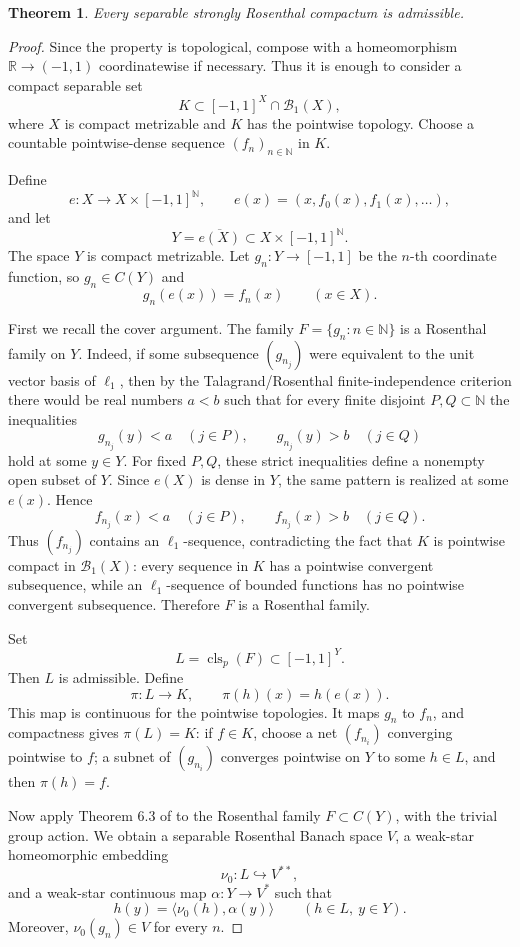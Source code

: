 \documentclass[11pt]{article}
\newtheorem{theorem}{Theorem}
\newcommand{\Baire}{\mathcal B_1}
\newcommand{\clp}{\operatorname{cls}_p}
\newcommand{\RR}{\mathbb R}
\newcommand{\NN}{\mathbb N}
\begin{document}
\begin{theorem}
Every separable strongly Rosenthal compactum is admissible.
\end{theorem}

\begin{proof}
Since the property is topological, compose with a homeomorphism
\(\RR\to(-1,1)\) coordinatewise if necessary.  Thus it is enough to consider a
compact separable set
\[
  K\subset[-1,1]^X\cap \Baire(X),
\]
where \(X\) is compact metrizable and \(K\) has the pointwise topology.  Choose
a countable pointwise-dense sequence \((f_n)_{n\in\NN}\) in \(K\).

Define
\[
  e:X\to X\times[-1,1]^{\NN},
  \qquad
  e(x)=(x,f_0(x),f_1(x),\ldots),
\]
and let
\[
  Y=\overline{e(X)}\subset X\times[-1,1]^{\NN}.
\]
The space \(Y\) is compact metrizable.  Let \(g_n:Y\to[-1,1]\) be the
\(n\)-th coordinate function, so \(g_n\in C(Y)\) and
\[
  g_n(e(x))=f_n(x) \qquad (x\in X).
\]

First we recall the cover argument.  The family \(F=\{g_n:n\in\NN\}\) is a
Rosenthal family on \(Y\).  Indeed, if some subsequence \((g_{n_j})\) were
equivalent to the unit vector basis of \(\ell_1\), then by the
Talagrand/Rosenthal finite-independence criterion there would be real numbers
\(a<b\) such that for every finite disjoint \(P,Q\subset\NN\) the inequalities
\[
  g_{n_j}(y)<a \quad (j\in P),
  \qquad
  g_{n_j}(y)>b \quad (j\in Q)
\]
hold at some \(y\in Y\).  For fixed \(P,Q\), these strict inequalities define
a nonempty open subset of \(Y\).  Since \(e(X)\) is dense in \(Y\), the same
pattern is realized at some \(e(x)\).  Hence
\[
  f_{n_j}(x)<a \quad (j\in P),
  \qquad
  f_{n_j}(x)>b \quad (j\in Q).
\]
Thus \((f_{n_j})\) contains an \(\ell_1\)-sequence, contradicting the fact
that \(K\) is pointwise compact in \(\Baire(X)\): every sequence in \(K\) has a
pointwise convergent subsequence, while an \(\ell_1\)-sequence of bounded
functions has no pointwise convergent subsequence.  Therefore \(F\) is a
Rosenthal family.

Set
\[
  L=\clp(F)\subset[-1,1]^Y.
\]
Then \(L\) is admissible.  Define
\[
  \pi:L\to K,
  \qquad
  \pi(h)(x)=h(e(x)).
\]
This map is continuous for the pointwise topologies.  It maps \(g_n\) to
\(f_n\), and compactness gives \(\pi(L)=K\): if \(f\in K\), choose a net
\((f_{n_i})\) converging pointwise to \(f\); a subnet of \((g_{n_i})\)
converges pointwise on \(Y\) to some \(h\in L\), and then
\(\pi(h)=f\).

Now apply Theorem 6.3 of \cite{GM0803} to the Rosenthal family
\(F\subset C(Y)\), with the trivial group action.  We obtain a separable
Rosenthal Banach space \(V\), a weak-star homeomorphic embedding
\[
  \nu_0:L\hookrightarrow V^{**},
\]
and a weak-star continuous map \(\alpha:Y\to V^*\) such that
\[
  h(y)=\langle \nu_0(h),\alpha(y)\rangle
  \qquad (h\in L,\ y\in Y).
\]
Moreover, \(\nu_0(g_n)\in V\) for every \(n\).


\end{proof}
\end{document}
